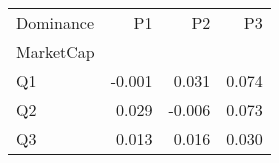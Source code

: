 \begin{tabular}{lrrr}
\toprule
Dominance & P1 & P2 & P3 \\
MarketCap &  &  &  \\
\midrule
Q1 & -0.001 & 0.031 & 0.074 \\
Q2 & 0.029 & -0.006 & 0.073 \\
Q3 & 0.013 & 0.016 & 0.030 \\
\bottomrule
\end{tabular}
